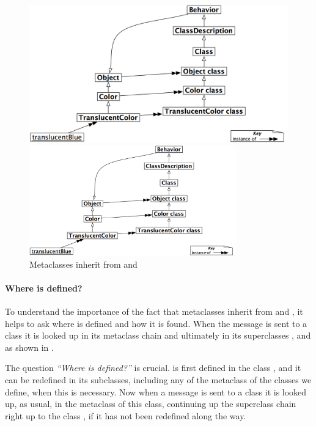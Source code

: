 \documentclass[a4paper,10pt,twoside]{book}
\begin{document}
\begin{center}
\begin{figure}
\ifluluelse
	{\centerline{\includegraphics[width=\textwidth]{TranslucentBehavior}}}
	{\centerline{\includegraphics[width=0.8\textwidth]{TranslucentBehavior}}}
\caption{Metaclasses inherit from  and \label{fig:inheritbehavior}}
\end{figure}
\end{center}

\paragraph{Where is  defined?}
To understand the importance of the fact that metaclasses inherit from  and , it helps to ask where  is defined and how it is found. When the message  is sent to a class it is looked up in its metaclass chain and ultimately in its superclasses ,  and  as shown in .

The question \emph{``Where  is defined?''} is crucial.  is first defined in the class , and it can be redefined in its subclasses, including any of the metaclass of the classes we define, when this is necessary. Now when a message  is sent to a class it is looked up, as usual, in the metaclass of this class, continuing up the superclass chain right up to the class , if it has not been redefined along the way.
\end{document}
